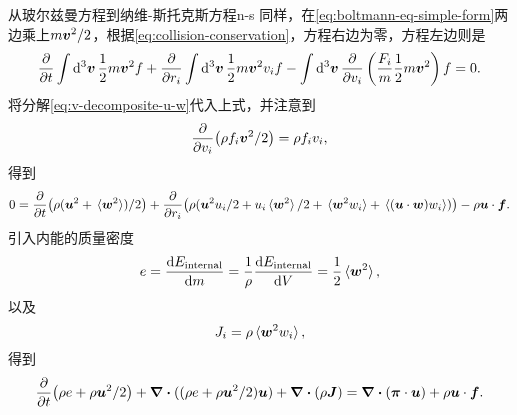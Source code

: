 \begin{back}{从玻尔兹曼方程到纳维-斯托克斯方程}{n-s}
    同样，在\eqref{eq:boltmann-eq-simple-form}两边乘上$m \vb*{v}^2 / 2$，根据\eqref{eq:collision-conservation}，方程右边为零，方程左边则是
    \[
        \pdv{t} \int \dd[3]{\vb*{v}} \frac{1}{2} m \vb*{v}^2 f + \pdv{r_i} \int \dd[3]{\vb*{v}} \frac{1}{2} m \vb*{v}^2 v_i f - \int \dd[3]{\vb*{v}} \pdv{v_i} \left( \frac{F_i}{m} \frac{1}{2} m \vb*{v}^2 \right) f = 0.
    \]
    将分解\eqref{eq:v-decomposite-u-w}代入上式，并注意到
    \[
        \pdv{v_i} (\rho f_i \vb*{v}^2 / 2) = \rho f_i v_i,
    \]
    得到
    \[
        0 = \pdv{t} (\rho (\vb*{u}^2 + \expval*{\vb*{w}^2}) / 2) + \pdv{r_i} (\rho (\vb*{u}^2 u_i / 2 + u_i \expval*{\vb*{w}^2} /2 + \expval*{\vb*{w}^2 w_i} + \expval*{(\vb*{u} \cdot \vb*{w}) w_i})) - \rho \vb*{u} \cdot \vb*{f}. 
    \]
    引入内能的质量密度
    \begin{equation}
        e = \dv{E_\text{internal}}{m} = \frac{1}{\rho} \dv{E_\text{internal}}{V} = \frac{1}{2} \expval*{\vb*{w}^2},
    \end{equation}
    以及
    \begin{equation}
        J_i = \rho \expval*{\vb*{w}^2 w_i},
    \end{equation}
    得到
    \begin{equation}
        \pdv{t} (\rho e + \rho \vb*{u}^2 / 2) + \div{((\rho e + \rho \vb*{u}^2 / 2) \vb*{u})} + \div{(\rho \vb*{J})} = \div{(\vb*{\pi} \cdot \vb*{u})} + \rho \vb*{u} \cdot \vb*{f}.
        \label{eq:ns-energy}
    \end{equation}


\end{back}
